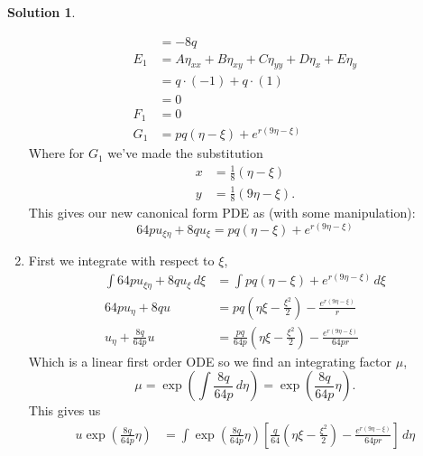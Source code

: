 \documentclass[10pt]{article}
\theoremstyle{definition}
\newtheorem{soln}{Solution}
\begin{document}
\begin{soln}
\begin{enumerate}[label=(\alph*)]
\begin{align*}
                & =-8q                                                               \\
            E_1 & =A\eta_{xx}+B\eta_{xy}+C\eta_{yy}+D\eta_{x}+E\eta_{y}              \\
                & =q\cdot(-1)+q\cdot(1)                                              \\
                & =0                                                                 \\
            F_1 & =0                                                                 \\
            G_1 & =pq\left(\eta-\xi\right)+e^{r\left(9\eta-\xi\right)}
          \end{align*}
          Where for $G_1$ we've made the substitution
          \begin{align*}
            x & =\frac{1}{8}\left(\eta-\xi\right)   \\
            y & =\frac{1}{8}\left(9\eta-\xi\right).
          \end{align*}
          This gives our new canonical form PDE as (with some manipulation):
          $$64pu_{\xi\eta}+8qu_\xi=pq\left(\eta-\xi\right)+e^{r\left(9\eta-\xi\right)}$$
    \item First we integrate with respect to $\xi$,
          \begin{align*}
            \int64pu_{\xi\eta}+8qu_\xi\,d\xi & =\int pq\left(\eta-\xi\right)+e^{r\left(9\eta-\xi\right)}\,d\xi                                                  \\
            64pu_{\eta}+8qu                  & =pq \left({\eta}{\xi} - \frac{{\xi}^{2}}{2}\right) - \frac{e^{r \left(9{\eta} - {\xi}\right)}}{r}                \\
            u_{\eta}+\frac{8q}{64p}u         & =\frac{pq}{64p} \left({\eta}{\xi} - \frac{{\xi}^{2}}{2}\right) - \frac{e^{r \left(9{\eta} - {\xi}\right)}}{64pr}
          \end{align*}
          Which is a linear first order ODE so we find an integrating factor $\mu$,
          $$\mu=\exp\left(\int\frac{8q}{64p}\,d\eta\right)=\exp\left(\frac{8q}{64p}\eta\right).$$
          This gives us
          \begin{align*}
            u\exp\left(\frac{8q}{64p}\eta\right) & =\int\exp\left(\frac{8q}{64p}\eta\right)
            \left[\frac{q}{64} \left({\eta}{\xi} - \frac{{\xi}^{2}}{2}\right) - \frac{e^{r \left(9{\eta} - {\xi}\right)}}{64pr}\right]\,d\eta                                                         \\

\end{align*}
\end{enumerate}
\end{soln}
\end{document}
